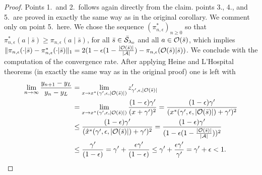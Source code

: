 \begin{proof}
Points 1.\ and 2.\ follows again directly from the claim.
points 3., 4., and 5.\ are proved in exactly the same way as in the original corollary. We comment only on point 5.\ here. 
We chose the sequence $(\pi_{n,\epsilon}^{*})_{n\geq 0}$ so that $\pi_{n,\epsilon}^*(a\mid\bar{s}) \geq \pi_{n,\epsilon}(a\mid\bar{s})$, for all $\bar{s}\in\bar{\mathcal{S}}_{\mathit{\lambda}_0}$ and all $a\in\mathcal{O}(\bar{s})$, which implies 
$\|
\pi_{n,\epsilon}(\cdot|\bar{s})
- \pi_{n,\epsilon}^{*} (\cdot|\bar{s}) 
\|_1
= 2(1-\epsilon(1-\frac{|\mathcal{O}(\bar{s})|}{|\mathcal{A}|})-\pi_{n,\epsilon}(\mathcal{O}(\bar{s})|\bar{s}))
$.
We conclude with the computation of
the convergence rate. 
After applying Heine and L'Hospital
theorems (in exactly the same way as in the original proof)
one is left with
\begin{align*}
\lim_{n\rightarrow \infty} \frac{y_{n+1}-y_L}{y_n-y_L}
&=
\lim_{x\rightarrow x^*(\gamma',\epsilon,|\mathcal{O}(\bar{s})|)}
z_{\gamma',\epsilon,|\mathcal{O}(\bar{s})|}'
\\
&=
\lim_{x\rightarrow x^*(\gamma',\epsilon,|\mathcal{O}(\bar{s})|)}
\frac{(1-\epsilon)\gamma'}{(x+\gamma')^2}
=
\frac{(1-\epsilon)\gamma'}{(x^*(\gamma',\epsilon,|\mathcal{O}(\bar{s})|)+\gamma')^2}
\\
&\leq
\frac{(1-\epsilon)\gamma'}{(\hat{x}^*(\gamma',\epsilon,|\mathcal{O}(\bar{s})|)+\gamma')^2}
=
\frac{(1-\epsilon)\gamma'}{(1-\epsilon(1-\frac{|\mathcal{O}(\bar{s})|}{|\mathcal{A}|}))^2}
\\
&\leq
\frac{\gamma'}{(1-\epsilon)}
=
\gamma' + \frac{\epsilon\gamma'}{(1-\epsilon)}
\leq
\gamma' + \frac{\epsilon\gamma'}{\gamma'}
=
\gamma'+\epsilon
<
1.
\end{align*}
\end{proof}





